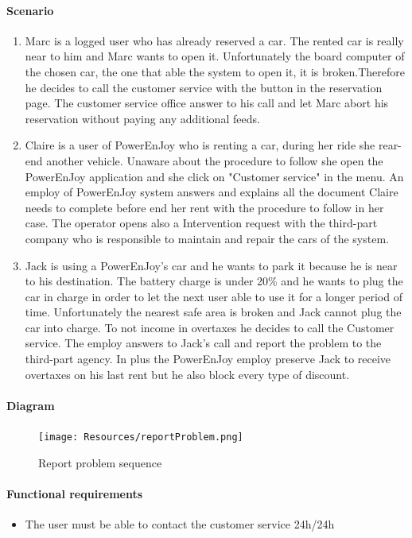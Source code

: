 \paragraph{Scenario}
\begin{enumerate}
	\item Marc is a logged user who has already reserved a car. The rented car is really near to him and Marc wants to open it. Unfortunately the board computer of the chosen car, the one that able the system to open it, it is broken.Therefore he decides to call the customer service with the button in the reservation page. The customer service office answer to his call and let Marc abort his reservation without paying any additional feeds.
	\item Claire is a user of PowerEnJoy who is renting a car, during her ride she rear-end another vehicle. Unaware about the procedure to follow she open the PowerEnJoy application and she click on "Customer service" in the menu. An employ of PowerEnJoy system answers and explains all the document Claire needs to complete before end her rent with the procedure to follow in her case. The operator opens also a Intervention request with the third-part company who is responsible to maintain and repair the cars of the system.
	\item Jack is using a PowerEnJoy's car and he wants to park it because he is near to his destination. The battery charge is under 20\% and he wants to plug the car in charge in order to let the next user able to use it for a longer period of time. Unfortunately the nearest safe area is broken and Jack cannot plug the car into charge. To not income in overtaxes he decides to call the Customer service. The employ answers to Jack's call and report the problem to the third-part agency. In plus the PowerEnJoy employ preserve Jack to receive overtaxes on his last rent but he also block every type of discount.
\end{enumerate}
\paragraph{Diagram}
\begin{figure}[H]
   \begin{center}
    \texttt{[image: Resources/reportProblem.png]}
    \caption{Report problem sequence}
   \end{center}
    \label{fig:reportProblemSequence}
\end{figure}

\paragraph {Functional requirements }
\begin{itemize}
	\item The user must be able to contact the customer service 24h/24h
\end{itemize}

